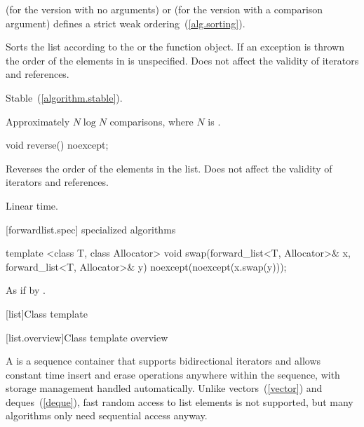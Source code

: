 \begin{itemdescr}
\pnum
\requires {} (for the version with no arguments) or  (for the
version with a comparison argument) defines a strict weak ordering~(\ref{alg.sorting}).

\pnum
\effects Sorts the list according to the  or the  function object.
If an exception is thrown the order of the elements in  is unspecified.
Does not affect the validity of iterators and references.

\pnum
\remarks Stable~(\ref{algorithm.stable}).

\pnum
\complexity Approximately $N \log N$ comparisons, where $N$ is .
\end{itemdescr}

%
\begin{itemdecl}
void reverse() noexcept;
\end{itemdecl}

\begin{itemdescr}
\pnum
\effects Reverses the order of the elements in the list.
Does not affect the validity of iterators and references.

\pnum
\complexity Linear time.
\end{itemdescr}

[forwardlist.spec]{ specialized algorithms}

%
\begin{itemdecl}
template <class T, class Allocator>
  void swap(forward_list<T, Allocator>& x, forward_list<T, Allocator>& y)
    noexcept(noexcept(x.swap(y)));
\end{itemdecl}

\begin{itemdescr}
\pnum
\effects As if by .
\end{itemdescr}

[list]{Class template }

[list.overview]{Class template  overview}

\pnum
{}%
A
is a sequence container that supports
bidirectional iterators and allows constant time insert and erase
operations anywhere within the sequence, with storage management handled
automatically. Unlike vectors~(\ref{vector}) and deques~(\ref{deque}),
fast random access to list elements is not supported, but many
algorithms only need sequential access anyway.

